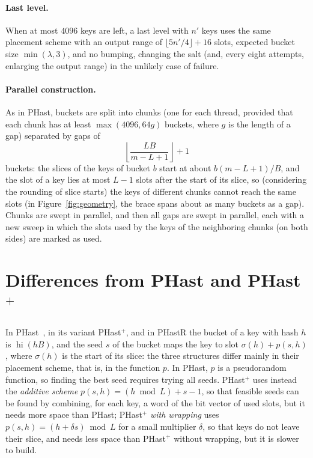 \documentclass[11pt]{article}
\newcommand{\PHast}{PHast\xspace}
\newcommand{\PHastP}{PHast$^+$\xspace}
\newcommand{\PHastR}{PHastR\xspace}
\newcommand{\hi}{\operatorname{hi}}
\begin{document}
\paragraph{Last level.}
When at most $4096$ keys are left, a last level with $n'$ keys uses the same
placement scheme with an output range of $\lfloor 5n'/4\rfloor+16$ slots, expected
bucket size $\min(\lambda,3)$, and
no bumping, changing the salt (and, every eight
attempts, enlarging the output range) in the unlikely case of failure.

\paragraph{Parallel construction.}
As in \PHast, buckets are split into chunks (one for each thread, provided
that each chunk has at least $\max(4096,64g)$ buckets, where $g$ is the
length of a gap) separated by gaps of
\[
\left\lfloor \frac{LB}{m-L+1}\right\rfloor+1
\]
buckets: the slices of the keys of bucket $b$ start at about $b(m-L+1)/B$, and the slot
of a key lies at most $L-1$ slots after the start of its slice, so
(considering the rounding of slice starts) the keys of different chunks
cannot reach the same slots (in Figure~\ref{fig:geometry}, the brace spans
about as many buckets as a gap). Chunks are swept in parallel, and then all gaps
are swept in parallel, each with a new sweep in which the slots used by the
keys of the neighboring chunks (on both sides) are marked as used.

\section{Differences from \PHast and \PHastP}
\label{sec:differences}

In \PHast~\cite{BeSPHast}, in its variant \PHastP, and in \PHastR the bucket
of a key with hash $h$ is $\hi(hB)$, and the seed $s$ of the bucket maps the
key to slot $\sigma(h)+p(s,h)$, where $\sigma(h)$ is the start of its slice:
the three structures differ mainly in their placement scheme, that is, in the
function $p$. In \PHast, $p$ is a pseudorandom function, so finding the best
seed requires trying all seeds. \PHastP uses instead the \emph{additive
scheme} $p(s,h)=(h\bmod L)+s-1$, so that feasible seeds can be found by
combining, for each key, a word of the bit vector of used slots, but it needs
more space than \PHast; \PHastP
\emph{with wrapping} uses $p(s,h)=(h+\delta s)\bmod L$ for a small multiplier
$\delta$, so that keys do not leave their slice, and needs less space than
\PHastP without wrapping, but it is slower to build.
\end{document}
